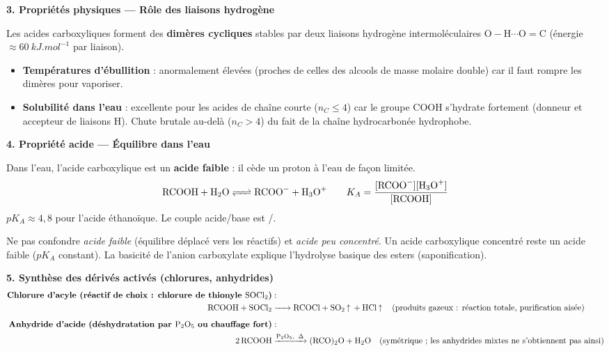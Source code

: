 \documentclass[11pt]{article}
\begin{document}
\begin{aretenir}
\textbf{3. Propriétés physiques — Rôle des liaisons hydrogène}
\begin{propriete}
Les acides carboxyliques forment des \textbf{dimères cycliques} stables par deux liaisons hydrogène intermoléculaires $\mathrm{O-H\cdots O=C}$ (énergie $\approx \SI{60}{kJ.mol^{-1}}$ par liaison).
\begin{itemize}
  \item \textbf{Températures d'ébullition} : anormalement élevées (proches de celles des alcools de masse molaire double) car il faut rompre les dimères pour vaporiser.
  \item \textbf{Solubilité dans l'eau} : excellente pour les acides de chaîne courte ($n_C \le 4$) car le groupe $\mathrm{COOH}$ s'hydrate fortement (donneur et accepteur de liaisons H). Chute brutale au-delà ($n_C > 4$) du fait de la chaîne hydrocarbonée hydrophobe.
\end{itemize}
\end{propriete}

\textbf{4. Propriété acide — Équilibre dans l'eau}
\begin{definition}
Dans l'eau, l'acide carboxylique est un \textbf{acide faible} : il cède un proton à l'eau de façon limitée.
\[ \ce{RCOOH + H2O <=> RCOO- + H3O+} \qquad K_A = \frac{[\ce{RCOO-}][\ce{H3O+}]}{[\ce{RCOOH}]} \]
$pK_A \approx 4,8$ pour l'acide éthanoïque. Le couple acide/base est /.
\end{definition}
\begin{attention}
Ne pas confondre \emph{acide faible} (équilibre déplacé vers les réactifs) et \emph{acide peu concentré}. Un acide carboxylique concentré reste un acide faible ($pK_A$ constant). La basicité de l'anion carboxylate explique l'hydrolyse basique des esters (saponification).
\end{attention}

\textbf{5. Synthèse des dérivés activés (chlorures, anhydrides)}
\begin{align*}
\textbf{Chlorure d'acyle (réactif de choix : chlorure de thionyle $\ce{SOCl2}$)} &: \\
\ce{RCOOH + SOCl2 &-> RCOCl + SO2 ^ + HCl ^} \quad \text{(produits gazeux : réaction totale, purification aisée)} \\[0.5em]
\textbf{Anhydride d'acide (déshydratation par $\ce{P2O5}$ ou chauffage fort)} &: \\
\ce{2 RCOOH &->[P2O5,\ \Delta] (RCO)2O + H2O} \quad \text{(symétrique ; les anhydrides mixtes ne s'obtiennent pas ainsi)}
\end{align*}


\end{aretenir}
\end{document}
